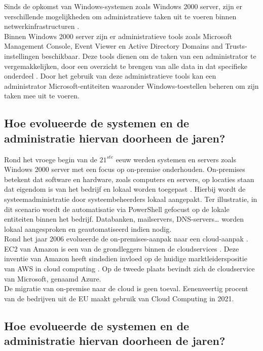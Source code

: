 Sinds de opkomst van Windows-systemen zoals Windows 2000 server, zijn er verschillende mogelijkheden om administratieve taken uit te voeren binnen netwerkinfrastructuren \autocite{Tulloch2001}. \\

Binnen Windows 2000 server zijn er administratieve tools zoals Microsoft Management Console, Event Viewer en Active Directory Domains and Trusts-instellingen beschikbaar. Deze tools dienen om de taken van een administrator te vergemakkelijken, door een overzicht te brengen van alle data in dat specifieke onderdeel \autocite{Sibisi2022}. Door het gebruik van deze administratieve tools kan een administrator Microsoft-entiteiten waaronder Windows-toestellen beheren om zijn taken mee uit te voeren. 

\subsection{Hoe evolueerde de systemen en de administratie hiervan doorheen de jaren?}

Rond het vroege begin van de $21^{ste}$ eeuw werden systemen en servers zoals Windows 2000 server met een focus op on-premise onderhouden. On-premises betekent dat software en hardware, zoals computers en servers, op locaties staan dat eigendom is van het bedrijf en lokaal worden toegepast \autocite{Insight2023}. Hierbij wordt de systeemadministratie door systeembeheerders lokaal aangepakt. Ter illustratie, in dit scenario wordt de automatisatie via PowerShell gefocust op de lokale entiteiten binnen het bedrijf. Databanken, mailservers, DNS-servers… worden lokaal aangesproken en geautomatiseerd indien nodig. \\

Rond het jaar 2006 evolueerde de on-premises-aanpak naar een cloud-aanpak \autocite{Hayes2008}. EC2 van Amazon is een van de grondleggers binnen de cloudservices \autocite{Qian2009}. Deze inventie van Amazon heeft sindsdien invloed op de huidige marktleiderspositie van AWS in cloud computing \autocite{Vailshery2022}. Op de tweede plaats bevindt zich de cloudservice van Microsoft, genaamd Azure. \\

De migratie van on-premise naar de cloud is geen toeval. Eenenveertig procent van de bedrijven uit de \ac{EU} maakt gebruik van Cloud Computing in 2021. %

\subsection{Hoe evolueerde de systemen en de administratie hiervan doorheen de jaren?}

